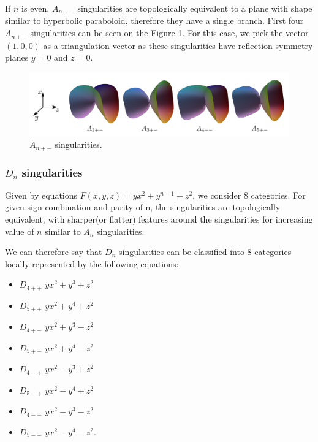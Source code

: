 If $n$ is even, $A_{n+-}$ singularities are topologically equivalent to a plane
with shape similar to hyperbolic paraboloid, therefore they have a single branch.
First four $A_{n+-}$ singularities can be seen on the Figure \ref{img:5}.
For this case, we pick the vector $(1, 0, 0)$ as a triangulation vector as
these singularities have reflection symmetry planes $y=0$ and $z=0$.

\begin{figure}
    \centerline{\includegraphics[scale=0.5]{images/img5}}
    \caption[$A_{n+-}$ singularities]
    {$A_{n+-}$ singularities. \cite{singsurf}}
    \label{img:5}
\end{figure}

\subsubsection*{$D_n$ singularities}

Given by equations $F(x,y,z)=yx^2\pm y^{n-1}\pm z^2$, we consider 8 categories.
For given sign combination and parity of n, the singularities are topologically
equivalent, with sharper(or flatter) features around the singularities for increasing
value of $n$ similar to $A_n$ singularities.

We can therefore say that $D_n$ singularities can be classified into 8 categories
locally represented by the following equations:
\begin{itemize}
    \item $D_{4++}$ \hspace{5mm} $yx^2 + y^3 + z^2$
    \item $D_{5++}$ \hspace{5mm} $yx^2 + y^4 + z^2$
    \item $D_{4+-}$ \hspace{5mm} $yx^2 + y^3 - z^2$
    \item $D_{5+-}$ \hspace{5mm} $yx^2 + y^4 - z^2$
    \item $D_{4-+}$ \hspace{5mm} $yx^2 - y^3 + z^2$
    \item $D_{5-+}$ \hspace{5mm} $yx^2 - y^4 + z^2$
    \item $D_{4--}$ \hspace{5mm} $yx^2 - y^3 - z^2$
    \item $D_{5--}$ \hspace{5mm} $yx^2 - y^4 - z^2$.
\end{itemize}

